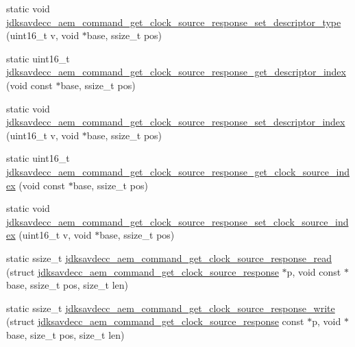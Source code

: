 \begin{DoxyCompactItemize}
static void \hyperlink{group__command__get__clock__source__response_gafbcadf11126f91332045dabd1270b991}{jdksavdecc\+\_\+aem\+\_\+command\+\_\+get\+\_\+clock\+\_\+source\+\_\+response\+\_\+set\+\_\+descriptor\+\_\+type} (uint16\+\_\+t v, void $\ast$base, ssize\+\_\+t pos)
\item 
static uint16\+\_\+t \hyperlink{group__command__get__clock__source__response_gad8b3114a21e48deca8292d646417d4ce}{jdksavdecc\+\_\+aem\+\_\+command\+\_\+get\+\_\+clock\+\_\+source\+\_\+response\+\_\+get\+\_\+descriptor\+\_\+index} (void const $\ast$base, ssize\+\_\+t pos)
\item 
static void \hyperlink{group__command__get__clock__source__response_ga3b39c41632e76d7fdc4c21f9d593ff43}{jdksavdecc\+\_\+aem\+\_\+command\+\_\+get\+\_\+clock\+\_\+source\+\_\+response\+\_\+set\+\_\+descriptor\+\_\+index} (uint16\+\_\+t v, void $\ast$base, ssize\+\_\+t pos)
\item 
static uint16\+\_\+t \hyperlink{group__command__get__clock__source__response_gaed5029568cbd203a27a906e689311b16}{jdksavdecc\+\_\+aem\+\_\+command\+\_\+get\+\_\+clock\+\_\+source\+\_\+response\+\_\+get\+\_\+clock\+\_\+source\+\_\+index} (void const $\ast$base, ssize\+\_\+t pos)
\item 
static void \hyperlink{group__command__get__clock__source__response_ga666a7507e148a0b4efb9ba60f9b91396}{jdksavdecc\+\_\+aem\+\_\+command\+\_\+get\+\_\+clock\+\_\+source\+\_\+response\+\_\+set\+\_\+clock\+\_\+source\+\_\+index} (uint16\+\_\+t v, void $\ast$base, ssize\+\_\+t pos)
\item 
static ssize\+\_\+t \hyperlink{group__command__get__clock__source__response_gad17a1b97558b2aea05688490ef206904}{jdksavdecc\+\_\+aem\+\_\+command\+\_\+get\+\_\+clock\+\_\+source\+\_\+response\+\_\+read} (struct \hyperlink{structjdksavdecc__aem__command__get__clock__source__response}{jdksavdecc\+\_\+aem\+\_\+command\+\_\+get\+\_\+clock\+\_\+source\+\_\+response} $\ast$p, void const $\ast$base, ssize\+\_\+t pos, size\+\_\+t len)
\item 
static ssize\+\_\+t \hyperlink{group__command__get__clock__source__response_ga12b1892513730a5a90bd359272562e9e}{jdksavdecc\+\_\+aem\+\_\+command\+\_\+get\+\_\+clock\+\_\+source\+\_\+response\+\_\+write} (struct \hyperlink{structjdksavdecc__aem__command__get__clock__source__response}{jdksavdecc\+\_\+aem\+\_\+command\+\_\+get\+\_\+clock\+\_\+source\+\_\+response} const $\ast$p, void $\ast$base, size\+\_\+t pos, size\+\_\+t len)
\end{DoxyCompactItemize}


